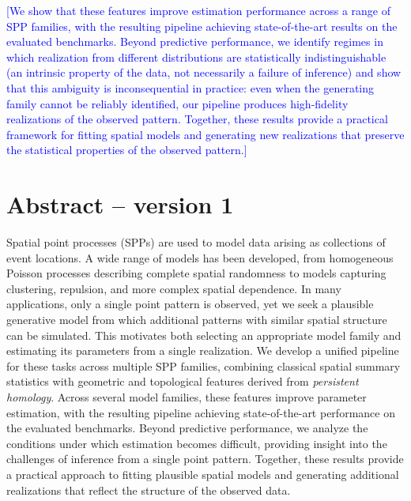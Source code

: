 \documentclass[11pt]{article}
\newcommand{\edit}[1]{\textcolor{blue}{[#1]}}
\begin{document}
\edit{We show that these features improve estimation performance across a range of SPP families, with the resulting pipeline achieving state-of-the-art results on the evaluated benchmarks. Beyond predictive performance, we identify regimes in which realization from different distributions are statistically indistinguishable (an intrinsic property of the data, not necessarily a failure of inference) and show that this ambiguity is inconsequential in practice: even when the generating family cannot be reliably identified, our pipeline produces high-fidelity realizations of the observed pattern. Together, these results provide a practical framework for fitting spatial models and generating new realizations that preserve the statistical properties of the observed pattern.}


\section*{Abstract -- version 1}


Spatial point processes (SPPs) are  used to model data arising as collections of event locations. A wide range of models has been developed, from homogeneous Poisson processes describing complete spatial randomness to models capturing clustering, repulsion, and more complex spatial dependence. In many applications, only a single point pattern is observed, yet we seek a plausible generative model from which additional patterns with similar spatial structure can be simulated. This motivates both selecting an appropriate model family and estimating its parameters from a single realization. We develop a unified pipeline for these tasks across multiple SPP families, combining classical spatial summary statistics with geometric and topological features derived from \emph{persistent homology}. Across several model families, these features improve parameter estimation, with the resulting pipeline achieving state-of-the-art performance on the evaluated benchmarks. Beyond predictive performance, we analyze the conditions under which estimation becomes difficult, providing insight into the challenges of inference from a single point pattern. Together, these results provide a practical approach to fitting plausible spatial models and generating additional realizations that reflect the structure of the observed data.
\end{document}

